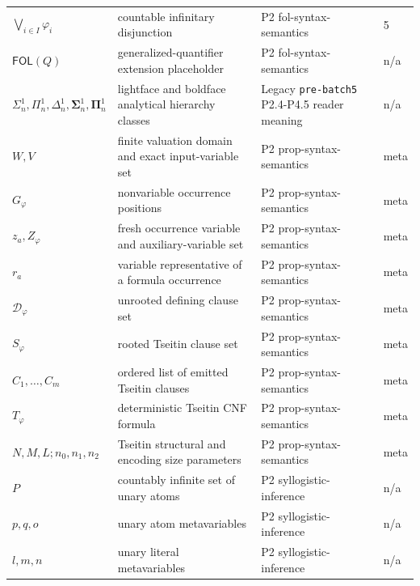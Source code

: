\begin{longtable}{@{}p{}p{}p{}p{}@{}}
\(\bigvee_{i\in I}\varphi_i\) & countable infinitary disjunction & P2 fol-\allowbreak{}syntax-\allowbreak{}semantics & 5 \\
\(\mathsf{FOL}(Q)\) & generalized-quantifier extension placeholder & P2 fol-\allowbreak{}syntax-\allowbreak{}semantics & n/a \\
\(\Sigma^1_n,\allowbreak \Pi^1_n,\allowbreak \Delta^1_n,\allowbreak \boldsymbol\Sigma^1_n,\allowbreak \boldsymbol\Pi^1_n\) & lightface and boldface analytical hierarchy classes & Legacy \texttt{pre-\allowbreak{}batch5} P2.\allowbreak{}4-\allowbreak{}P4.\allowbreak{}5 reader meaning & n/a \\
\(W,\allowbreak V\) & finite valuation domain and exact input-variable set & P2 prop-\allowbreak{}syntax-\allowbreak{}semantics & meta \\
\(G_\varphi\) & nonvariable occurrence positions & P2 prop-\allowbreak{}syntax-\allowbreak{}semantics & meta \\
\(z_a,\allowbreak Z_\varphi\) & fresh occurrence variable and auxiliary-variable set & P2 prop-\allowbreak{}syntax-\allowbreak{}semantics & meta \\
\(r_a\) & variable representative of a formula occurrence & P2 prop-\allowbreak{}syntax-\allowbreak{}semantics & meta \\
\(\mathcal D_\varphi\) & unrooted defining clause set & P2 prop-\allowbreak{}syntax-\allowbreak{}semantics & meta \\
\(S_\varphi\) & rooted Tseitin clause set & P2 prop-\allowbreak{}syntax-\allowbreak{}semantics & meta \\
\(C_1,\allowbreak \ldots,\allowbreak C_m\) & ordered list of emitted Tseitin clauses & P2 prop-\allowbreak{}syntax-\allowbreak{}semantics & meta \\
\(T_\varphi\) & deterministic Tseitin CNF formula & P2 prop-\allowbreak{}syntax-\allowbreak{}semantics & meta \\
\(N,\allowbreak M,\allowbreak L;\allowbreak n_0,\allowbreak n_1,\allowbreak n_2\) & Tseitin structural and encoding size parameters & P2 prop-\allowbreak{}syntax-\allowbreak{}semantics & meta \\
\(P\) & countably infinite set of unary atoms & P2 syllogistic-\allowbreak{}inference & n/a \\
\(p,\allowbreak q,\allowbreak o\) & unary atom metavariables & P2 syllogistic-\allowbreak{}inference & n/a \\
\(l,\allowbreak m,\allowbreak n\) & unary literal metavariables & P2 syllogistic-\allowbreak{}inference & n/a \\

\end{longtable}
